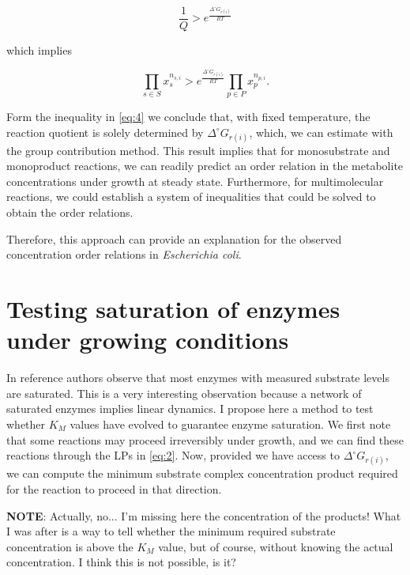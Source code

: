 \documentclass[12pt]{article}
\begin{document}
  \begin{equation}
    \label{eq:4}
    \frac{1}{Q} > e^{\frac{\Delta^{\circ} G_{r(i)}}{RT}}
  \end{equation}

  which implies

  \begin{equation}
    \label{eq:5}
    \displaystyle \prod_{s \in S}{x_s^{n_{s,i}}} > e^{\frac{\Delta^{\circ} G_{r(i)} }{RT}} \displaystyle \prod_{p \in P}{x_p^{n_{p,i}}.}
  \end{equation}

  Form the inequality in \ref{eq:4} we conclude that, with fixed temperature, the reaction quotient is solely determined by $\Delta^{\circ} G_{r(i)}$, which, we can estimate with the group contribution method. This result implies that for monosubstrate and monoproduct reactions, we can readily predict an order relation in the metabolite concentrations under growth at steady state. Furthermore, for multimolecular reactions, we could establish a system of inequalities that could be solved to obtain the order relations.

  Therefore, this approach can provide an explanation for the observed concentration order relations in \emph{Escherichia coli}.

  \section{Testing saturation of enzymes under growing conditions}
  In reference \cite{Bennett2008} authors observe that most enzymes with measured substrate levels are saturated. This is a very interesting observation because a network of saturated enzymes implies linear dynamics. I propose here a method to test whether $K_M$ values have evolved to guarantee enzyme saturation. We first note that some reactions may proceed irreversibly under growth, and we can find these reactions through the LPs in \ref{eq:2}. Now, provided we have access to $\Delta^{\circ} G_{r(i)}$, we can compute the minimum substrate complex concentration product required for the reaction to proceed in that direction.

  \textbf{NOTE}: Actually, no... I'm missing here the concentration of the products! What I was after is a way to tell whether the minimum required substrate concentration is above the $K_M$ value, but of course, without knowing the actual concentration. I think this is not possible, is it?





  
\end{document}
